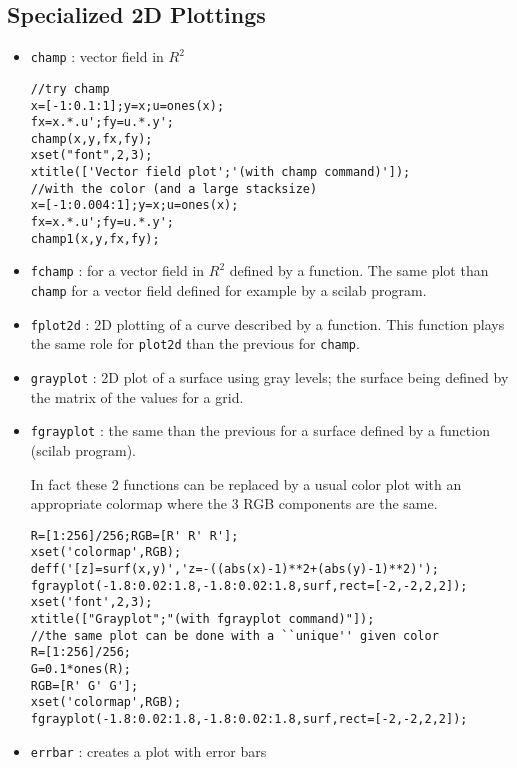 \subsection{Specialized 2D Plottings}
%
\begin{itemize}
        \item \verb+champ+	: vector field in $R^{2}$

\begin{verbatim}
//try champ
x=[-1:0.1:1];y=x;u=ones(x);
fx=x.*.u';fy=u.*.y';
champ(x,y,fx,fy);
xset("font",2,3);
xtitle(['Vector field plot';'(with champ command)']);
//with the color (and a large stacksize)
x=[-1:0.004:1];y=x;u=ones(x);
fx=x.*.u';fy=u.*.y';
champ1(x,y,fx,fy);
\end{verbatim}





	\item \verb+fchamp+	: for a vector field in $R^{2}$ defined by a 
function. The same plot than {\tt champ} for a vector field defined
for example by a scilab program.

	\item \verb+fplot2d+	: 2D plotting of a curve described by a 
function. This function plays the same role for {\tt plot2d} than the 
previous for {\tt champ}.

	\item \verb+grayplot+	: 2D plot of a surface using gray
levels; the surface being defined by the matrix of the values
for a grid.

	\item \verb+fgrayplot+	: the same than the previous for a
surface defined by a function (scilab program).

In fact these 2 functions can be replaced by a usual color plot with
an appropriate colormap where the 3 RGB components are the same.

\begin{verbatim}
R=[1:256]/256;RGB=[R' R' R'];
xset('colormap',RGB);
deff('[z]=surf(x,y)','z=-((abs(x)-1)**2+(abs(y)-1)**2)');
fgrayplot(-1.8:0.02:1.8,-1.8:0.02:1.8,surf,rect=[-2,-2,2,2]);
xset('font',2,3);
xtitle(["Grayplot";"(with fgrayplot command)"]);
//the same plot can be done with a ``unique'' given color
R=[1:256]/256;
G=0.1*ones(R);
RGB=[R' G' G'];
xset('colormap',RGB);
fgrayplot(-1.8:0.02:1.8,-1.8:0.02:1.8,surf,rect=[-2,-2,2,2]);
\end{verbatim}

%

	\item \verb+errbar+	: creates a plot with error bars
\end{itemize}
%


